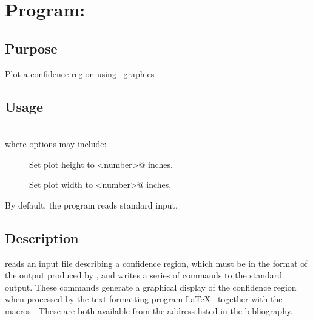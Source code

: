 \chapter{Program: \label{ch.ci2ptx}}

\section{Purpose} Plot a confidence region using \PiCTeX\ graphics

\section{Usage\label{sec.ci2ptx.usage}} \\
where options may include:
\begin{description}
\item[] Set plot height to \verb@<number>@ inches.
\item[] Set plot width to \verb@<number>@ inches.
\end{description}
By default, the program reads standard input.

\section{Description}

 reads an input file describing a confidence region, which
must be in the format of the output produced by , and writes
a series of \PiCTeX{} commands to the standard output.  These commands
generate a graphical display of the confidence region when processed
by the text-formatting program \LaTeX\ \cite{Lamport:LDP-94} together with the
\PiCTeX{} macros \cite{Wichura:PM-87}.  These are both available from
the address listed in the bibliography.


